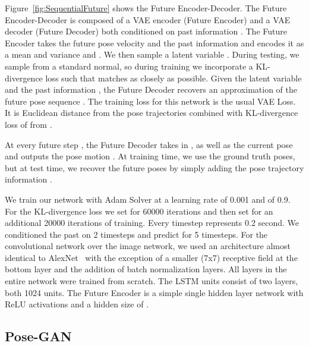  Figure~\ref{fig:SequentialFuture} shows the Future Encoder-Decoder. The Future Encoder-Decoder is composed of a VAE encoder (Future Encoder) and a VAE decoder (Future Decoder) both conditioned on past information . The Future Encoder takes the future pose velocity  and the past information  and encodes it as a mean and variance  and . We then sample a latent variable . During testing, we 
sample  from a standard normal, so during training we incorporate a KL-divergence loss such that  matches  as closely as possible. Given the latent variable  and the past information , the Future Decoder recovers an approximation of the future pose sequence . The training loss for this network is the usual VAE Loss. It is Euclidean distance from the pose trajectories combined with KL-divergence loss of  from .

\vspace{-.3cm}

\vspace{-.3cm}

At every future step , the Future Decoder takes in , as well as the current pose  and outputs the pose motion . At training time, we use the ground truth poses, but at test time, we recover the future poses by simply adding the pose trajectory information . 

 We train our network with Adam Solver at a learning rate of 0.001 and  of 0.9. For the KL-divergence loss we set  for 60000 iterations and then set  for an additional 20000 iterations of training. Every timestep  represents 0.2 second. We conditioned the past on 2 timesteps and predict for 5 timesteps. For the convolutional network over the image network, we used an architecture almost identical to AlexNet~\cite{Krizhevsky12} with the exception of a smaller (7x7) receptive field at the bottom layer and the addition of batch normalization layers. All layers in the entire network were trained from scratch. The LSTM units consist of two layers, both 1024 units. The Future Encoder is a simple single hidden layer network with ReLU activations and a hidden size of . 



\subsection{Pose-GAN}

